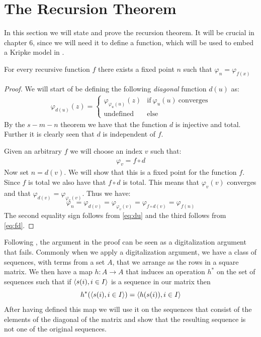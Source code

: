 \documentclass[../main.tex]{subfiles}
\begin{document}
\section{The Recursion Theorem}
In this section we will state and prove the recursion theorem. It will be
crucial in chapter 6, since we will need it to define a function, which will be
used to embed a Kripke model in \PRA.
\begin{thm}
	For every recursive function $f$ there exists a fixed point $n$ such
	that $\varphi_n=\varphi_{f(x)}$
\end{thm}
\begin{proof}
	We will start of be defining the following \textit{diagonal} function
	$d(u)$ as:
	\begin{align}
		\label{eq:du}
		\varphi_{d(u)}(z)=\begin{cases}
		\varphi_{\varphi_u(u)}(z)& \text{if}\ \varphi_u(u)\
		\text{converges}\\
		\text{undefined} & \text{else}
	\end{cases}
	\end{align}
	By the $s-m-n$ theorem we have that the function $d$ is injective and
	total. Further it is clearly seen that $d$ is independent of $f$.

	Given an arbitrary $f$ we will choose an index $v$ such that:
	\begin{align}
		\label{eq:fd}
		\varphi_v=f\circ d
	\end{align}
	Now set $n=d(v)$. We will show that this is a fixed point for the
	function $f$. Since $f$ is total we also have that $f\circ d$ is total.
	This means that $\varphi_v(v)$ converges and that
	$\varphi_{d(v)}=\varphi_{\varphi_v(v)}$. Thus we have:
	\[\varphi_n=\varphi_{d(v)}=\varphi_{\varphi_v(v)}=\varphi_{f\circ
	d(v)}=\varphi_{f(n)}\]
	The second equality sign follows from \ref{eq:du} and the third follows
	from \ref{eq:fd}.
\end{proof}
Following \parencite{Owen1973}, the argument in the proof can be seen as a
digitalization argument that fails. Commonly when we apply a digitalization
argument, we have a class of sequences, with terms from a set $A$, that we arrange as the rows in a square
matrix. We then have a map $h:A\rightarrow A$ that induces an operation $h^*$ on
the set of sequences such that if $\langle s(i),i\in I\rangle$ is a sequence in our
matrix then 
\[h^*(\langle s(i),i\in I\rangle)=\langle h(s(i)),i\in I\rangle\]
After having defined this map we will use it on the sequences that consist of
the elements of the  diagonal of the matrix and
show that the resulting sequence is not one of the original sequences. 
\end{document}
